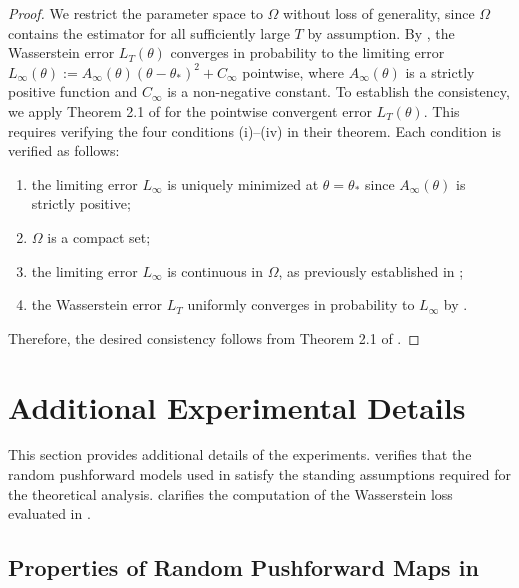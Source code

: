 \documentclass[a4paper, 11pt]{article}
\theoremstyle{definition}
\begin{document}
\begin{proof}
    We restrict the parameter space to $\Omega$ without loss of generality, since $\Omega$ contains the estimator for all sufficiently large $T$ by assumption.
	By , the Wasserstein error $L_T(\theta)$ converges in probability to the limiting error $L_\infty(\theta) := A_\infty(\theta) (\theta - \theta_*)^2 + C_\infty$ pointwise, where $A_\infty(\theta)$ is a strictly positive function and $C_\infty$ is a non-negative constant.
    To establish the consistency, we apply Theorem 2.1 of \cite{Newey1994} for the pointwise convergent error $L_T(\theta)$.
    This requires verifying the four conditions (i)--(iv) in their theorem.
    Each condition is verified as follows:
    \begin{enumerate}[label=(\roman*)]
        \item the limiting error $L_\infty$ is uniquely minimized at $\theta = \theta_*$ since $A_\infty(\theta)$ is strictly positive;
        \item $\Omega$ is a compact set;
        \item the limiting error $L_\infty$ is continuous in $\Omega$, as previously established in ;
        \item the Wasserstein error $L_T$ uniformly converges in probability to $L_\infty$ by .
    \end{enumerate}
    Therefore, the desired consistency follows from Theorem 2.1 of \cite{Newey1994}.
\end{proof}



\section{Additional Experimental Details} \label{apx:experimental_detail}

This section provides additional details of the experiments.
 verifies that the random pushforward models used in  satisfy the standing assumptions required for the theoretical analysis.
 clarifies the computation of the Wasserstein loss evaluated in .

\subsection{Properties of Random Pushforward Maps in }
\label{apx:simulation_maps}
\end{document}
